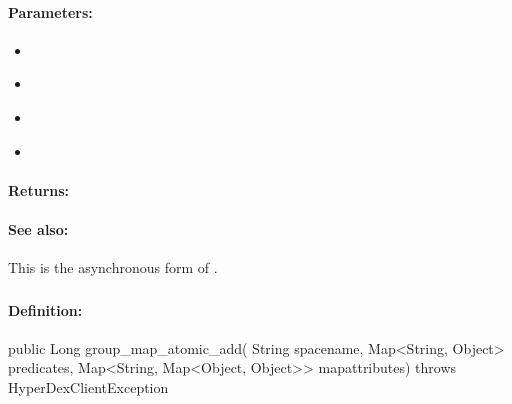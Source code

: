 \paragraph{Parameters:}
\begin{itemize}[noitemsep]
\item {}\\

\item {}\\

\item {}\\

\item {}\\

\end{itemize}

\paragraph{Returns:}


\paragraph{See also:}  This is the asynchronous form of .

\pagebreak
\subsubsection{}
\label{api:java:group_map_atomic_add}


\paragraph{Definition:}
\begin{javacode}
public Long group_map_atomic_add(
        String spacename,
        Map<String, Object> predicates,
        Map<String, Map<Object, Object>> mapattributes) throws HyperDexClientException
\end{javacode}

